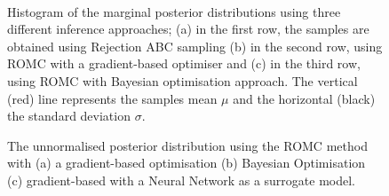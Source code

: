 \begin{figure}[ht]
  \begin{center}
    \resizebox{.24\columnwidth}{!}{%
      
    }
    \resizebox{.24\columnwidth}{!}{%
      
    }
    \resizebox{.24\columnwidth}{!}{%
      
    }
    \resizebox{.24\columnwidth}{!}{%
      
    }\\
    \resizebox{.24\columnwidth}{!}{%
      
    }
    \resizebox{.24\columnwidth}{!}{%
      
    }
    \resizebox{.24\columnwidth}{!}{%
      
    }
    \resizebox{.24\columnwidth}{!}{%
      
    }
    \end{center}
    \caption[MA2 example, evaluation of the marginal
    distributions.]{Histogram of the marginal posterior distributions
      using three different inference approaches; (a) in the first
      row, the samples are obtained using Rejection ABC sampling (b)
      in the second row, using ROMC with a gradient-based optimiser
      and (c) in the third row, using ROMC with Bayesian optimisation
      approach. The vertical (red) line represents the samples mean
      \(\mu\) and the horizontal (black) the standard deviation
      \(\sigma\).}
  \label{fig:ma2_3}
\end{figure}

\begin{figure}[ht]
  \begin{center}
    \resizebox{.32\columnwidth}{!}{%
      
    }
    \resizebox{.32\columnwidth}{!}{%
      
    }
    \resizebox{.32\columnwidth}{!}{%
      
    }
    \end{center}
    \caption[MA2 example, posterior distribution.]{The unnormalised posterior distribution using the ROMC method with (a) a gradient-based optimisation (b) Bayesian Optimisation (c) gradient-based with a Neural Network as a surrogate model.}
  \label{fig:ma2_4}
\end{figure}


